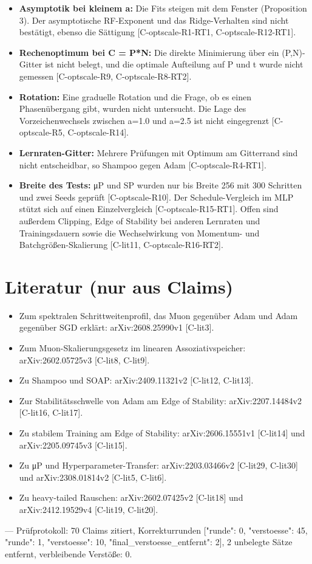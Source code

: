 \documentclass[10pt,twocolumn]{article}
\begin{document}
\begin{itemize}
\item \textbf{Asymptotik bei kleinem a:} Die Fits steigen mit dem Fenster (Proposition 3). Der asymptotische RF-Exponent und das Ridge-Verhalten sind nicht bestätigt, ebenso die Sättigung {\scriptsize[C-optscale-R1-RT1, C-optscale-R12-RT1]}.
\item \textbf{Rechenoptimum bei C = P*N:} Die direkte Minimierung über ein (P,N)-Gitter ist nicht belegt, und die optimale Aufteilung auf P und t wurde nicht gemessen {\scriptsize[C-optscale-R9, C-optscale-R8-RT2]}.
\item \textbf{Rotation:} Eine graduelle Rotation und die Frage, ob es einen Phasenübergang gibt, wurden nicht untersucht. Die Lage des Vorzeichenwechsels zwischen a=1.0 und a=2.5 ist nicht eingegrenzt {\scriptsize[C-optscale-R5, C-optscale-R14]}.
\item \textbf{Lernraten-Gitter:} Mehrere Prüfungen mit Optimum am Gitterrand sind nicht entscheidbar, so Shampoo gegen Adam {\scriptsize[C-optscale-R4-RT1]}.
\item \textbf{Breite des Tests:} μP und SP wurden nur bis Breite 256 mit 300 Schritten und zwei Seeds geprüft {\scriptsize[C-optscale-R10]}. Der Schedule-Vergleich im MLP stützt sich auf einen Einzelvergleich {\scriptsize[C-optscale-R15-RT1]}. Offen sind außerdem Clipping, Edge of Stability bei anderen Lernraten und Trainingsdauern sowie die Wechselwirkung von Momentum- und Batchgrößen-Skalierung {\scriptsize[C-lit11, C-optscale-R16-RT2]}.
\end{itemize}

\section{Literatur (nur aus Claims)}

\begin{itemize}
\item Zum spektralen Schrittweitenprofil, das Muon gegenüber Adam und Adam gegenüber SGD erklärt: arXiv:2608.25990v1 {\scriptsize[C-lit3]}.
\item Zum Muon-Skalierungsgesetz im linearen Assoziativspeicher: arXiv:2602.05725v3 {\scriptsize[C-lit8, C-lit9]}.
\item Zu Shampoo und SOAP: arXiv:2409.11321v2 {\scriptsize[C-lit12, C-lit13]}.
\item Zur Stabilitätsschwelle von Adam am Edge of Stability: arXiv:2207.14484v2 {\scriptsize[C-lit16, C-lit17]}.
\item Zu stabilem Training am Edge of Stability: arXiv:2606.15551v1 {\scriptsize[C-lit14]} und arXiv:2205.09745v3 {\scriptsize[C-lit15]}.
\item Zu μP und Hyperparameter-Transfer: arXiv:2203.03466v2 {\scriptsize[C-lit29, C-lit30]} und arXiv:2308.01814v2 {\scriptsize[C-lit5, C-lit6]}.
\item Zu heavy-tailed Rauschen: arXiv:2602.07425v2 {\scriptsize[C-lit18]} und arXiv:2412.19529v4 {\scriptsize[C-lit19, C-lit20]}.
\end{itemize}

---
Prüfprotokoll: 70 Claims zitiert, Korrekturrunden [{"runde": 0, "verstoesse": 45}, {"runde": 1, "verstoesse": 10}, {"final_verstoesse_entfernt": 2}], 2 unbelegte Sätze entfernt, verbleibende Verstöße: 0.
\end{document}
